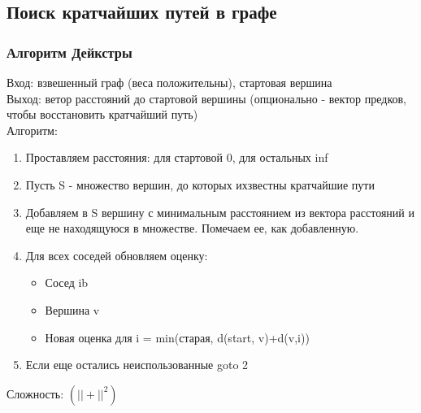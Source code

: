 \documentclass[a4paper]{article}
\begin{document}
\subsection{Поиск кратчайших путей в графе}
\subsubsection{Алгоритм Дейкстры}
Вход: взвешенный граф (веса положительны), стартовая вершина\\
Выход: ветор расстояний до стартовой вершины (опционально - вектор предков, чтобы восстановить кратчайший путь)\\
Алгоритм:
\begin{enumerate}
	\item Проставляем расстояния: для стартовой 0, для остальных inf
	\item Пусть S - множество вершин, до которых ихзвестны кратчайшие пути
	\item Добавляем в S вершину с минимальным расстоянием из вектора расстояний и еще не находящуюся в множестве. Помечаем ее, как добавленную.
	\item Для всех соседей обновляем оценку:
	\begin{itemize}
		\item  Сосед ib 
		\item Вершина v
		\item Новая оценка для i = min(старая, d(start, v)+d(v,i))
	\end{itemize}
	\item Если еще остались неиспользованные goto 2
\end{enumerate}
Сложность: $(|| + ||^2)$
\end{document}
